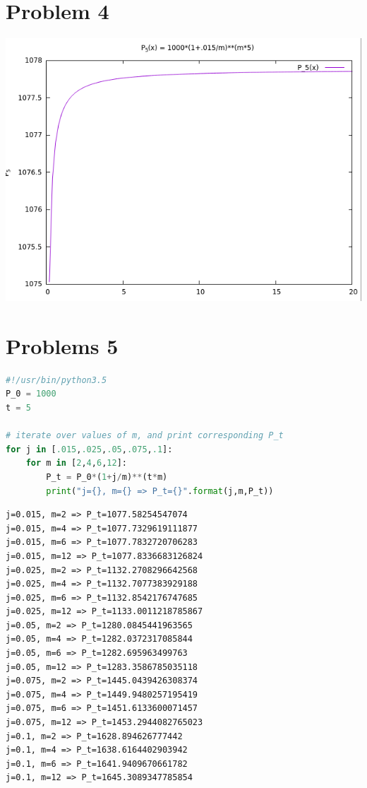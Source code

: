 \documentclass[12pt]{article}
\begin{document}
\section*{Problem 4}




\begin{center}
\includegraphics[scale=0.5]{screenshot1.png}
\end{center}

\section*{Problems 5}
\begin{lstlisting}[language=python, caption=$P_t$ calculator]
#!/usr/bin/python3.5
P_0 = 1000
t = 5

# iterate over values of m, and print corresponding P_t
for j in [.015,.025,.05,.075,.1]:
	for m in [2,4,6,12]:
		P_t = P_0*(1+j/m)**(t*m)
		print("j={}, m={} => P_t={}".format(j,m,P_t))
\end{lstlisting}

\begin{lstlisting}[caption=$P_t$ at different values of $m$ and $j$: Output]
j=0.015, m=2 => P_t=1077.58254547074
j=0.015, m=4 => P_t=1077.7329619111877
j=0.015, m=6 => P_t=1077.7832720706283
j=0.015, m=12 => P_t=1077.8336683126824
j=0.025, m=2 => P_t=1132.2708296642568
j=0.025, m=4 => P_t=1132.7077383929188
j=0.025, m=6 => P_t=1132.8542176747685
j=0.025, m=12 => P_t=1133.0011218785867
j=0.05, m=2 => P_t=1280.0845441963565
j=0.05, m=4 => P_t=1282.0372317085844
j=0.05, m=6 => P_t=1282.695963499763
j=0.05, m=12 => P_t=1283.3586785035118
j=0.075, m=2 => P_t=1445.0439426308374
j=0.075, m=4 => P_t=1449.9480257195419
j=0.075, m=6 => P_t=1451.6133600071457
j=0.075, m=12 => P_t=1453.2944082765023
j=0.1, m=2 => P_t=1628.894626777442
j=0.1, m=4 => P_t=1638.6164402903942
j=0.1, m=6 => P_t=1641.9409670661782
j=0.1, m=12 => P_t=1645.3089347785854

\end{lstlisting}
\end{document}
